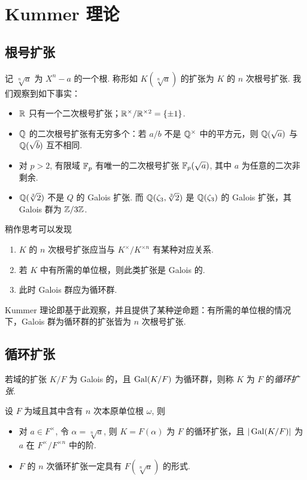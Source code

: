 \chapter{Kummer 理论}

\section{根号扩张}
记 $\sqrt[n]{a}$ 为 $X^n - a$ 的一个根.  称形如 $K(\sqrt[n]{a})$ 的扩张为 $K$ 的 $n$ 次根号扩张.  我们观察到如下事实：
\begin{fact}
  \begin{itemize}
  \item $\mathbb R$ 只有一个二次根号扩张；$\mathbb R^\times / \mathbb R^{\times2} = \{\pm 1\}$.
  \item $\mathbb Q$ 的二次根号扩张有无穷多个：若 $a/b$ 不是 $\mathbb Q^\times$ 中的平方元，则 $\mathbb Q(\sqrt a)$ 与 $\mathbb Q(\sqrt b)$ 互不相同.
  \item 对 $p > 2$, 有限域 $\mathbb F_p$ 有唯一的二次根号扩张 $\mathbb F_p(\sqrt a)$, 其中 $a$ 为任意的二次非剩余.
  \item $\mathbb Q(\sqrt[3]{2})$ 不是 $Q$ 的 Galois 扩张.  而 $\mathbb Q(\zeta_3, \sqrt[3]{2})$ 是 $\mathbb Q(\zeta_3)$ 的 Galois 扩张，其 Galois 群为 $\mathbb Z/3\mathbb Z$.
  \end{itemize}
\end{fact}
稍作思考可以发现
\begin{obs}
  \begin{enumerate}
  \item $K$ 的 $n$ 次根号扩张应当与 $K^\times / K^{\times n}$ 有某种对应关系.
  \item 若 $K$ 中有所需的单位根，则此类扩张是 Galois 的.
  \item 此时 Galois 群应为循环群.
  \end{enumerate}
\end{obs}

Kummer 理论即基于此观察，并且提供了某种逆命题：有所需的单位根的情况下，Galois 群为循环群的扩张皆为 $n$ 次根号扩张.

\section{循环扩张}
\begin{defn}
  若域的扩张 $K/F$ 为 Galois 的，且 $\operatorname{Gal}(K/F)$ 为循环群，则称 $K$ 为 $F$ 的\emph{循环扩张}.
\end{defn}

\begin{thm}
  设 $F$ 为域且其中含有 $n$ 次本原单位根 $\omega$, 则
  \begin{itemize}
  \item 对 $a \in F^\times$, 令 $\alpha = \sqrt[n]{a}$, 则 $K = F(\alpha)$ 为 $F$ 的循环扩张，且 $|\operatorname{Gal}(K/F)|$ 为 $a$ 在 $F^\times / F^{\times n}$ 中的阶.
  \item $F$ 的 $n$ 次循环扩张一定具有 $F(\sqrt[n]{a})$ 的形式.
  \end{itemize}
  \label{thm:cyclic-form}
\end{thm}

